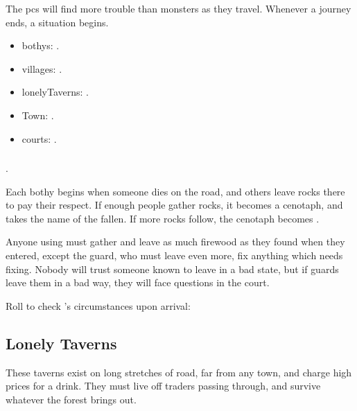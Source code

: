 \begin{multicols}{2}

\noindent
The \glspl{pc} will find more trouble than monsters as they travel.
Whenever a journey ends, a situation begins.

\begin{itemize}
  \item
  \Glspl{bothy}: .
  \item
  \Glspl{village}: .
  \item
  \Glspl{lonelyTavern}: .
  \item
  Town: .
  \item
  \Glspl{court}: .
\end{itemize}

\subsubsection{}
\label{bothyEvents}
.

Each \gls{bothy} begins when someone dies on the road, and others leave rocks there to pay their respect.
If enough people gather rocks, it becomes a cenotaph, and takes the name of the fallen.
If more rocks follow, the cenotaph becomes .

Anyone using  must gather and leave as much firewood as they found when they entered, except the \gls{guard}, who must leave even more, fix anything which needs fixing.
Nobody will trust someone known to leave  in a bad state, but if \glspl{guard} leave them in a bad way, they will face questions in the \gls{court}.

Roll to check 's circumstances upon arrival:

\bothyEvents

\needspace{18em}
\subsubsection{}
\label{villageEvents}

\encVillageEvent

\subsection{Lonely Taverns}
\label{lonelyTaverns}

These taverns exist on long stretches of road, far from any town, and
charge high prices for a drink. They must live off traders passing
through, and survive whatever the forest brings out.


\end{multicols}

